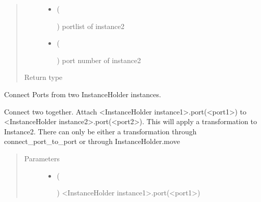 \documentclass[a4paper,10pt,english]{sphinxmanual}
\begin{document}
\begin{fulllineitems}
\begin{fulllineitems}
\begin{quote}
\begin{description}
\begin{itemize}
\item {} 
 (%
\begin{footnote}[42]\sphinxAtStartFootnote
{}
%
\end{footnote}) \textendash{} portlist of instance2

\item {} 
 (%
\begin{footnote}[43]\sphinxAtStartFootnote
{}
%
\end{footnote}) \textendash{} port number of instance2

\end{itemize}

\item[{Return type}] \leavevmode
{}

\end{description}\end{quote}

\end{fulllineitems}


\begin{fulllineitems}
\label{\detokenize{photonics:kppc.photonics.PhotDevice.connect_port_to_port}}
Connect Ports from two InstanceHolder instances.

Connect two  together. Attach \textless{}InstanceHolder instance1\textgreater{}.port(\textless{}port1\textgreater{}) to \textless{}InstanceHolder instance2\textgreater{}.port(\textless{}port2\textgreater{}).
This will apply a transformation to Instance2. There can only be either a transformation through connect\_port\_to\_port or through InstanceHolder.move
\begin{quote}\begin{description}
\item[{Parameters}] \leavevmode\begin{itemize}
\item {} 
 (%
\begin{footnote}[44]\sphinxAtStartFootnote
{}
%
\end{footnote}) \textendash{} \textless{}InstanceHolder instance1\textgreater{}.port(\textless{}port1\textgreater{})


\end{itemize}
\end{description}
\end{quote}
\end{fulllineitems}
\end{fulllineitems}
\end{document}
